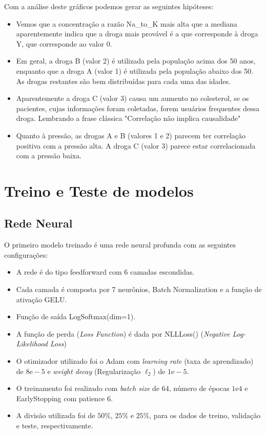 \documentclass[12pt,a4paper]{article}
\theoremstyle{definition}
\theoremstyle{theoremdd}
\begin{document}
Com a análise deste gráficos podemos gerar as seguintes hipóteses:
\begin{itemize}
\item Vemos que a concentração a razão Na\_to\_K mais alta que a mediana aparentemente indica que a droga mais provável é a que corresponde à droga Y, que corresponde ao valor 0.

\item Em geral, a droga B (valor 2) é utilizada pela população acima dos 50 anos, enquanto que a droga A (valor 1) é utilizada pela população abaixo dos 50. As drogas restantes são bem distribuídas para cada uma das idades.

\item Aparentemente a droga C (valor 3) causa um aumento no colesterol, se os pacientes, cujas informações foram coletadas, forem usuários frequentes dessa droga. Lembrando a frase clássica "Correlação não implica causalidade"

\item Quanto à pressão, as drogas A e B (valores 1 e 2) parecem ter correlação positiva com a pressão alta. A droga C (valor 3) parece estar correlacionada com a pressão baixa.
\end{itemize}

\section{Treino e Teste de modelos}

\subsection{Rede Neural}
O primeiro modelo treinado é uma rede neural profunda com as seguintes configurações:
\begin{itemize}
\item A rede é do tipo feedforward com 6 camadas escondidas.

\item Cada camada é composta por 7 neurônios, Batch Normalization e a função de ativação GELU.

\item Função de saída LogSoftmax(dim=1).

 \item A função de perda ({\it Loss Function}) é dada por NLLLoss() ({\it Negative Log-Likelihood Loss})

\item O otimizador utilizado foi o Adam com {\it learning rate} (taxa de aprendizado) de $8\mathrm{e}-5$ e {\it weight decay } (Regularização $\ell_{2}$) de $1\mathrm{e}-5$.

\item O treinamento foi realizado com {\it batch size} de 64, número de épocas $1\mathrm{e}4$ e EarlyStopping com patience 6.


\item A divisão utilizada foi de $50\%$, $25\%$ e $25\%$, para os dados de treino, validação e teste, respectivamente.
\end{itemize}
\end{document}
